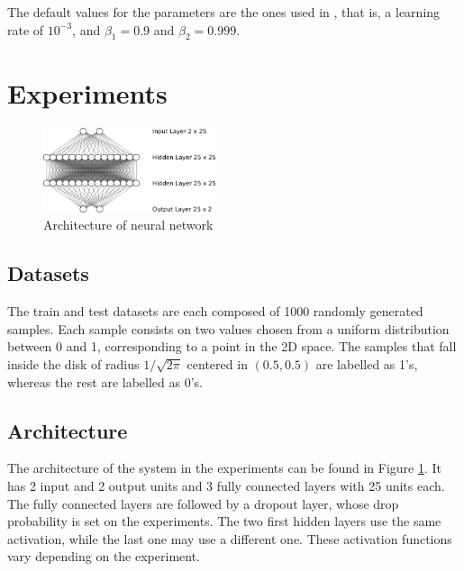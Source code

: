 \documentclass[10pt,conference,compsocconf]{IEEEtran}
\begin{document}
        The default values for the parameters are the ones used in   \cite{kingma2014adam}, that is, a learning rate of $10^{-3}$, and $\beta_1 = 0.9$ and $\beta_2 = 0.999$.

\section{Experiments} %

    \label{sec:experiments}
    \begin{figure}[t]
        \centering
        \includegraphics[width=0.45\textwidth]{figures/architecture_p2.png}
        \caption{Architecture of neural network}
        \label{fig:archi}
    \end{figure}
    

    \subsection{Datasets} %
    \label{sub:dataset}
    The train and test datasets are each composed of 1000 randomly generated samples. Each sample consists on two values chosen from a uniform distribution between 0 and 1, corresponding to a point in the 2D space. The samples that fall inside the disk of radius $1/\sqrt{2\pi}$ centered in $(0.5, 0.5)$ are labelled as 1's, whereas the rest are labelled as 0's.
    
    \subsection{Architecture} %
    \label{sub:architecture}
    
    The architecture of the system in the experiments can be found in Figure \ref{fig:archi}. It has 2 input and 2 output units and 3 fully connected layers with 25 units each. The fully connected layers are followed by a dropout layer, whose drop probability is set on the experiments. The two first hidden layers use the same activation, while the last one may use a different one. These activation functions vary depending on the experiment.
\end{document}
